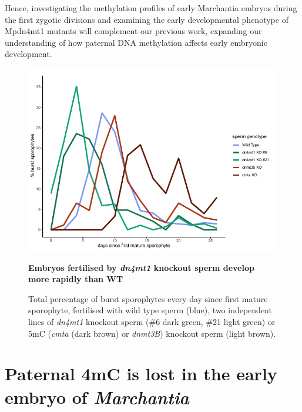 Hence, investigating the methylation profiles of early Marchantia embryos during the first zygotic divisions and examining the early developmental phenotype of Mpdn4mt1 mutants will complement our previous work, expanding our understanding of how paternal DNA methylation affects early embryonic development.

\begin{figure}[htbp!] 
\centering    
    \includegraphics[width=1\textwidth]{Chapter3/Figs/Intro/burstpeak_nuclei_number.pdf}
\caption{\textbf{Embryos fertilised by \textit{dn4mt1} knockout sperm develop more rapidly than WT}}
\label{fig:burstpeak}
\captionsetup{font=small}
    \caption*{Total percentage of burst sporophytes every day since first mature sporophyte, fertilised with wild type sperm (blue), two independent lines of \textit{dn4mt1} knockout sperm (\#6 dark green, \#21 light green) or 5mC (\textit{cmta} (dark brown) or \textit{dnmt3B}) knockout sperm (light brown). }
\end{figure}

\clearpage

\section{Paternal 4mC is lost in the early embryo of \textit{Marchantia}}

